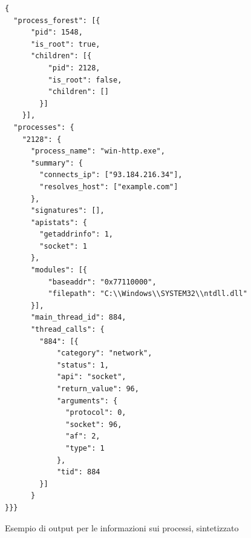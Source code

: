 \newpage
\begin{code}
\begin{verbatim}
{
  "process_forest": [{
      "pid": 1548,
      "is_root": true,
      "children": [{
          "pid": 2128,
          "is_root": false,
          "children": []
        }]
    }],
  "processes": {
    "2128": {
      "process_name": "win-http.exe",
      "summary": {
        "connects_ip": ["93.184.216.34"],
        "resolves_host": ["example.com"]
      },
      "signatures": [],
      "apistats": {
        "getaddrinfo": 1,
        "socket": 1
      },
      "modules": [{
          "baseaddr": "0x77110000",
          "filepath": "C:\\Windows\\SYSTEM32\\ntdll.dll"
      }],
      "main_thread_id": 884,
      "thread_calls": {
        "884": [{
            "category": "network",
            "status": 1,
            "api": "socket",
            "return_value": 96,
            "arguments": {
              "protocol": 0,
              "socket": 96,
              "af": 2,
              "type": 1
            },
            "tid": 884
        }]
      }
}}}
\end{verbatim}
\caption{Esempio di output per le informazioni sui processi, sintetizzato}
\end{code}

